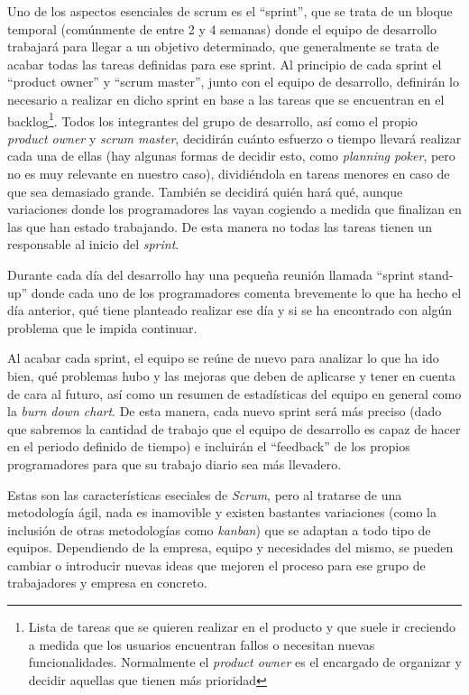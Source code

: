 Uno de los aspectos esenciales de scrum es el ``sprint'', que se trata de un bloque temporal (comúnmente de entre 2 y 4 semanas) donde el equipo de desarrollo trabajará para llegar a un objetivo determinado, que generalmente se trata de acabar todas las tareas definidas para ese sprint. 
Al principio de cada sprint  el ``product owner'' y ``scrum master'', junto con el equipo de desarrollo, definirán lo necesario a realizar en dicho sprint en base a las tareas que se encuentran en el backlog\footnote{Lista de tareas que se quieren realizar en el producto y que suele ir creciendo a medida que los usuarios encuentran fallos o necesitan nuevas funcionalidades. Normalmente el \textit{product owner} es el encargado de organizar y decidir aquellas que tienen más prioridad}. Todos los integrantes del grupo de desarrollo, así como el propio \textit{product owner} y \textit{scrum master}, decidirán cuánto esfuerzo o tiempo llevará realizar cada una de ellas (hay algunas formas de decidir esto, como \textit{planning poker}, pero no es muy relevante en nuestro caso), dividiéndola en tareas menores en caso de que sea demasiado grande. También se decidirá quién hará qué, aunque variaciones donde los programadores las vayan cogiendo a medida que finalizan en las que han estado trabajando. De esta manera no todas las tareas tienen un responsable al inicio del \textit{sprint}.

Durante cada día del desarrollo hay una pequeña reunión llamada ``sprint stand-up'' donde cada uno de los programadores comenta brevemente lo que ha hecho el día anterior, qué tiene planteado realizar ese día y si se ha encontrado con algún problema que le impida continuar.

Al acabar cada sprint, el equipo se reúne de nuevo para analizar lo que ha ido bien, qué problemas hubo y las mejoras que deben de aplicarse y tener en cuenta de cara al futuro, así como un resumen de estadísticas del equipo en general como la \textit{burn down chart}. De esta manera, cada nuevo sprint será más preciso (dado que sabremos la cantidad de trabajo que el equipo de desarrollo es capaz de hacer en el periodo definido de tiempo) e incluirán el ``feedback'' de los propios programadores para que su trabajo diario sea más llevadero.

Estas son las características eseciales de \textit{Scrum}, pero al tratarse de una metodología ágil, nada es inamovible y existen bastantes variaciones (como la inclusión de otras metodologías como \textit{kanban}) que se adaptan a todo tipo de equipos. Dependiendo de la empresa, equipo y necesidades del mismo, se pueden cambiar o introducir nuevas ideas que mejoren el proceso para ese grupo de trabajadores y empresa en concreto.

